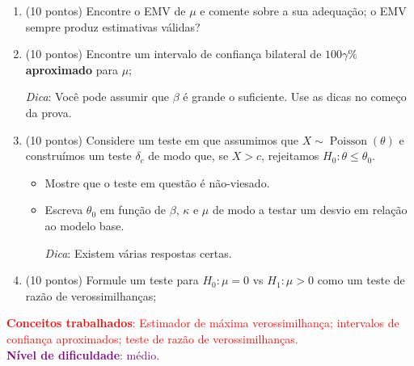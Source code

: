 \documentclass[a4paper,10pt, notitlepage]{report}
\begin{document}
\begin{enumerate}[label=\alph*)]
 \item (10 pontos) Encontre o EMV de $\mu$ e comente sobre a sua adequação; o EMV sempre produz estimativas válidas? 
  \item (10 pontos) Encontre um intervalo de confiança bilateral de $100\gamma\%$ \textbf{aproximado} para $\mu$;
  
  \textit{Dica}: Você pode assumir que $\beta$ é grande o suficiente. Use as dicas no começo da prova.
  \item (10 pontos) Considere um teste em que assumimos que $X\sim\operatorname{Poisson}(\theta)$ e construímos um teste $\delta_c$ de modo que, se $X > c$, rejeitamos $H_0: \theta \leq \theta_0$.
  \begin{itemize}
  \item Mostre que o teste em questão é não-viesado.
   \item Escreva $\theta_0$ em função de $\beta$, $\kappa$ e $\mu$ de modo a testar um desvio em relação ao modelo base.
   
   \textit{Dica}: Existem várias respostas certas.   
  \end{itemize}
 \item (10 pontos) Formule um teste para $H_0: \mu =0$ vs $H_1: \mu > 0$ como um teste de razão de verossimilhanças;
\end{enumerate}
\textcolor{red}{\textbf{Conceitos trabalhados}: Estimador de máxima verossimilhança; intervalos de confiança aproximados; teste de razão de verossimilhanças.}\\
\textcolor{purple}{\textbf{Nível de dificuldade}: médio.}\\
\end{document}
